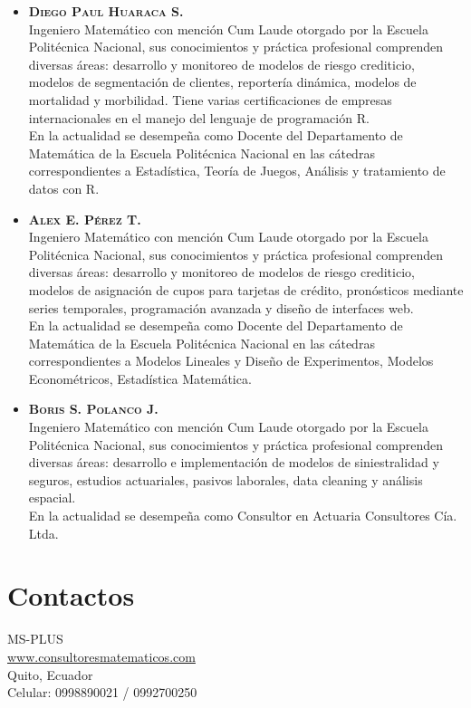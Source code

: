 \documentclass[11pt,a4paper,oneside]{article}\usepackage[]{graphicx}\usepackage[]{color}
\begin{document}
\begin{itemize}
   \item {\bf \scshape Diego Paul Huaraca S.}\\

Ingeniero Matemático con mención Cum Laude otorgado por la Escuela Politécnica Nacional, sus conocimientos y práctica profesional comprenden diversas áreas: desarrollo y monitoreo de modelos de riesgo crediticio, modelos de segmentación de clientes, reportería dinámica, modelos de mortalidad y morbilidad. Tiene varias certificaciones de empresas internacionales en el manejo del lenguaje de programación R.\\

En la actualidad se desempeña como Docente del Departamento de Matemática de la Escuela Politécnica Nacional en las cátedras correspondientes a Estadística, Teoría de Juegos, Análisis y tratamiento de datos con R.

   \item {\bf \scshape Alex E. Pérez T.}\\

Ingeniero Matemático con mención Cum Laude otorgado por la Escuela Politécnica Nacional, sus conocimientos y práctica profesional comprenden diversas áreas: desarrollo y monitoreo de modelos de riesgo crediticio, modelos de asignación de cupos para tarjetas de crédito, pronósticos mediante series temporales, programación avanzada y diseño de interfaces web.\\

En la actualidad se desempeña como Docente del Departamento de Matemática de la Escuela Politécnica Nacional en las cátedras correspondientes a Modelos Lineales y Diseño de Experimentos, Modelos Econométricos, Estadística Matemática.

   \item {\bf \scshape Boris S. Polanco J.}\\

Ingeniero Matemático con mención Cum Laude otorgado por la Escuela Politécnica Nacional, sus conocimientos y práctica profesional comprenden diversas áreas: desarrollo e implementación de modelos de siniestralidad y seguros, estudios actuariales, pasivos laborales, data cleaning y análisis espacial.\\

En la actualidad se desempeña como Consultor en Actuaria Consultores Cía. Ltda.
   
\end{itemize}

\section{Contactos}

\begin{flushleft}
MS-PLUS\\
\url{www.consultoresmatematicos.com}\\
Quito, Ecuador\\
Celular: 0998890021 / 0992700250
\end{flushleft}
\end{document}
